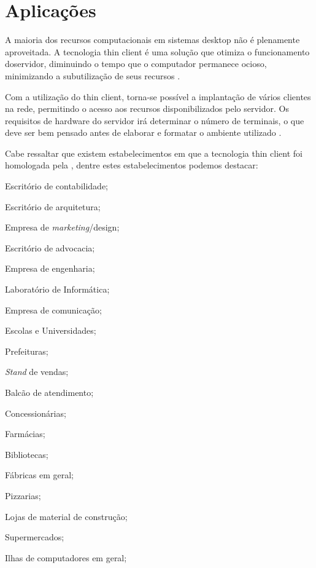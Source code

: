 \documentclass[
	12pt,				%
	openright,			%
	twoside,			%
	a4paper,			%
	chapter=TITLE,		%
	english,			%
	brazil				%
	]{abntex2}
\begin{document}
\newpage







\section{Aplicações}

A maioria dos recursos computacionais em sistemas desktop não é plenamente aproveitada. A tecnologia thin client é uma solução que otimiza o funcionamento doservidor, diminuindo o tempo que o computador permanece ocioso, minimizando a subutilização de seus recursos \cite{thinclientbrasil}. 

Com a utilização do thin client, torna-se possível a implantação de vários clientes na rede, permitindo o acesso aos recursos disponibilizados pelo servidor. Os requisitos de hardware do servidor irá determinar o número de terminais, o que deve ser bem pensado antes de elaborar e formatar o ambiente utilizado \cite{thinclientbrasil}. 

Cabe ressaltar que existem estabelecimentos em que a tecnologia thin client foi  homologada pela , dentre estes estabelecimentos podemos destacar:


\begin{alineas}
\item Escritório de contabilidade;
\item Escritório de arquitetura;
\item Empresa de \textit{marketing}/design;
\item Escritório de advocacia;
\item Empresa de engenharia;
\item Laboratório de Informática;
\item Empresa de comunicação;
\item Escolas e Universidades;
\item Prefeituras;
\item \textit{Stand} de vendas;
\item Balcão de atendimento;
\item Concessionárias;
\item Farmácias;
\item Bibliotecas;
\item Fábricas em geral;
\item Pizzarias;
\item Lojas de material de construção;
\item Supermercados;
\item Ilhas de computadores em geral;
\end{alineas}
\end{document}
